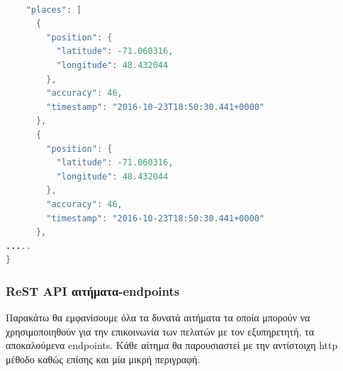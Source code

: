 \begin{lstlisting}[language=Java, caption=Μορφή JSON δεδομένων, label={lst:places-json}]

    "places": [
      {
        "position": {
          "latitude": -71.060316,
          "longitude": 48.432044
        },
        "accuracy": 46,
        "timestamp": "2016-10-23T18:50:30.441+0000"
      },
      {
        "position": {
          "latitude": -71.060316,
          "longitude": 48.432044
        },
        "accuracy": 46,
        "timestamp": "2016-10-23T18:50:30.441+0000"
      },
.....
}
\end{lstlisting}

\subsubsection{ReST API αιτήματα-endpoints}
Παρακάτω θα εμφανίσουμε όλα τα δυνατά αιτήματα τα οποία μπορούν να χρησιμοποιηθούν για την επικοινωνία των πελατών με τον εξυπηρετητή, τα αποκαλούμενα endpoints. Κάθε αίτημα θα παρουσιαστεί με την αντίστοιχη http μέθοδο καθώς επίσης και μία μικρή περιγραφή.

